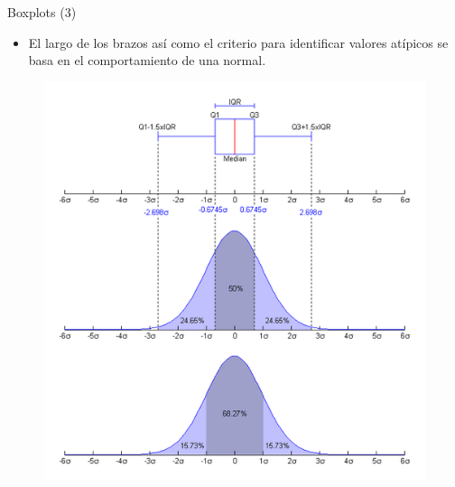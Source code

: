 \documentclass[handout]{beamer}
\begin{document}
\begin{frame}{Boxplots (3)}
\scriptsize{
\begin{itemize}
 \item El largo de los brazos así como el criterio para identificar valores atípicos se basa en el comportamiento de una normal.
\end{itemize}

\begin{figure}[h!]
	\centering
	\includegraphics[scale=0.35]{imagenes/Boxplot_vs_PDF.png}
	
	
	
\end{figure} 
}
\end{frame}
\end{document}
